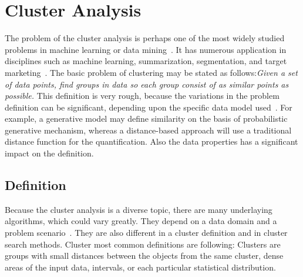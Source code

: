 \chapter{Cluster Analysis} \label{sec:clusteranalysis}
The problem of the cluster analysis is perhaps one of the most widely studied problems in machine learning or data mining~\cite{Aggarwal13}. It has numerous application in disciplines such as machine learning, summarization, segmentation, and target marketing~\cite{Jain10, Kaufman90}.
The basic problem of clustering may be stated as follows:\textit{Given a set of data points, find groups in data so each group consist of as similar points as possible.} This definition is very rough, because the variations in the problem definition can be significant, depending upon the specific data model used~\cite{Aggarwal13}. For example, a generative model may define similarity on the basis of probabilistic generative mechanism, whereas a distance-based approach will use a traditional distance function for the quantification. Also the data properties has a significant impact on the definition.
\section{Definition}

Because the cluster analysis is a diverse topic, there are many underlaying algorithms, which could vary greatly. They depend on a data domain and a problem scenario~\cite{Aggarwal13}. They are also different in a cluster definition and in cluster search methods. Cluster most common definitions are following: Clusters are groups with small distances between the objects from the same cluster, dense areas of the input data, intervals, or each particular statistical distribution.\\

